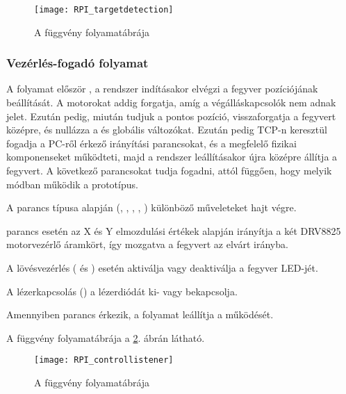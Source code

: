 \begin{figure}[h!]
	\centering
	\texttt{[image: RPI\_targetdetection]}
	\caption{A  függvény folyamatábrája}
	\label{fig:RPI_targetdetection}
\end{figure}


\subsubsection*{Vezérlés-fogadó folyamat}

A  folyamat először , a rendszer indításakor elvégzi a fegyver pozíciójának beállítását. A motorokat addig forgatja, amíg a végálláskapcsolók nem adnak jelet. Ezután pedig, miután tudjuk a pontos pozíció, visszaforgatja a fegyvert középre, és nullázza a  és  globális változókat. Ezután pedig TCP-n keresztül fogadja a PC-ről érkező irányítási parancsokat, és a megfelelő fizikai komponenseket működteti, majd a rendszer leállításakor újra középre állítja a fegyvert. A következő parancsokat tudja fogadni, attól függően, hogy melyik módban működik a prototípus. 

\begin{list}{-}{}
	\item A parancs típusa alapján (, , ,  , ) különböző műveleteket hajt végre.
	\item {} parancs esetén az X és Y elmozdulási értékek alapján irányítja a két DRV8825 motorvezérlő áramkört, így mozgatva a fegyvert az elvárt irányba.
	\item A lövésvezérlés ( és ) esetén aktiválja vagy deaktiválja a fegyver LED-jét.
	\item A lézerkapcsolás () a lézerdiódát ki- vagy bekapcsolja.
	\item Amennyiben  parancs érkezik, a folyamat leállítja a működését.
\end{list}

A függvény folyamatábrája a \ref{fig:RPI_controllistener}. ábrán látható.

\begin{figure}[h!]
	\centering
	\texttt{[image: RPI\_controllistener]}
	\caption{A  függvény folyamatábrája}
	\label{fig:RPI_controllistener}
\end{figure}


